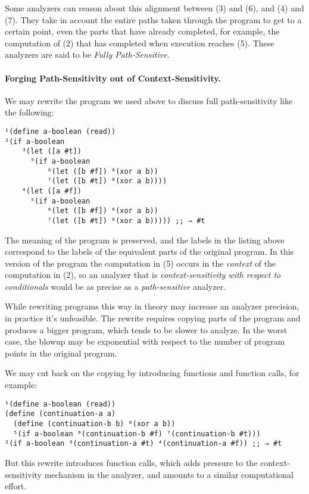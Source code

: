 \documentclass[12pt, oneside]{book}
\begin{document}
Some analyzers can reason about this alignment between (3) and (6), and (4) and (7). They take in account the entire paths taken through the program to get to a certain point, even the parts that have already completed, for example, the computation of (2) that has completed when execution reaches (5). These analyzers are said to be \emph{Fully Path-Sensitive}.

\paragraph{Forging Path-Sensitivity out of Context-Sensitivity.}

We may rewrite the program we used above to discuss full path-sensitivity like the following:

\begin{Verbatim}
¹(define a-boolean (read))
²(if a-boolean
    ³(let ([a #t])
      ⁵(if a-boolean
          ⁶(let ([b #f]) ⁸(xor a b))
          ⁷(let ([b #t]) ⁸(xor a b))))
    ⁴(let ([a #f])
      ⁵(if a-boolean
          ⁶(let ([b #f]) ⁸(xor a b))
          ⁷(let ([b #t]) ⁸(xor a b))))) ;; ⇒ #t
\end{Verbatim}

The meaning of the program is preserved, and the labels in the listing above correspond to the labels of the equivalent parts of the original program. In this version of the program the computation in (5) occurs in the \emph{context} of the computation in (2), so an analyzer that is \emph{context-sensitivity with respect to conditionals} would be as precise as a \emph{path-sensitive} analyzer.

While rewriting programs this way in theory may increase an analyzer precision, in practice it’s unfeasible. The rewrite requires copying parts of the program and produces a bigger program, which tends to be slower to analyze. In the worst case, the blowup may be exponential with respect to the number of program points in the original program.

We may cut back on the copying by introducing functions and function calls, for example:

\begin{Verbatim}
¹(define a-boolean (read))
(define (continuation-a a)
  (define (continuation-b b) ⁸(xor a b))
  ⁵(if a-boolean ⁶(continuation-b #f) ⁷(continuation-b #t)))
²(if a-boolean ³(continuation-a #t) ⁴(continuation-a #f)) ;; ⇒ #t
\end{Verbatim}

But this rewrite introduces function calls, which adds pressure to the context-sensitivity mechanism in the analyzer, and amounts to a similar computational effort.
\end{document}
